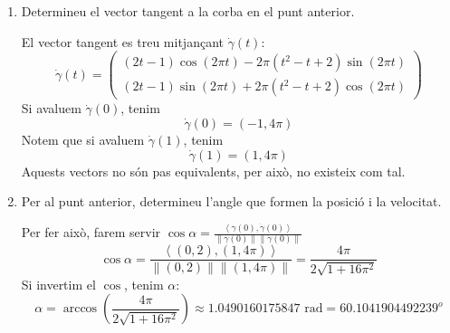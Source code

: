 \documentclass[a4paper, 12pt]{article}
\begin{document}
\begin{exercici}
\begin{enumerate}[label=\alph*)]
            \item Determineu el vector tangent a la corba en el punt anterior.\\
            \begin{solucio}
                El vector tangent es treu mitjançant $\dot{\gamma}(t)$:
                \begin{displaymath}
                    \dot{\gamma}(t) =
                    \begin{pmatrix}
                        \left(2t-1\right)\cos{\left(2\pi t\right)}-2\pi\left(t^2-t+2\right)\sin{\left(2\pi t\right)}\\
                        \left(2t-1\right)\sin{\left(2\pi t\right)}+2\pi\left(t^2-t+2\right)\cos{\left(2\pi t\right)}
                    \end{pmatrix}
                \end{displaymath}
                Si avaluem $\dot{\gamma}(0)$, tenim
                \begin{displaymath}
                    \dot{\gamma}(0) = \left(-1, 4\pi\right)
                \end{displaymath}
                Notem que si avaluem $\dot{\gamma}(1)$, tenim
                \begin{displaymath}
                    \dot{\gamma}(1) = \left(1, 4\pi\right)
                \end{displaymath}
                Aquests vectors no són pas equivalents, per això, no existeix com tal.
            \end{solucio}
            \item Per al punt anterior, determineu l'angle que formen la posició i la velocitat.\\
            \begin{solucio}
                Per fer això, farem servir $\cos{\alpha} = \frac{\left\langle\gamma(0), \dot{\gamma}(0)\right\rangle}{\left\lVert \gamma(0)\right\rVert \left\lVert \dot{\gamma}(0)\right\rVert }$
                \begin{displaymath}
                    \cos{\alpha} = \frac{\left\langle\left(0,2\right) , \left(1, 4\pi\right)\right\rangle}{\left\lVert \left(0,2\right) \right\rVert \left\lVert \left(1, 4\pi\right) \right\rVert} = \frac{4\pi}{2\sqrt{1+16\pi^2}}
                \end{displaymath}
                Si invertim el $\cos$, tenim $\alpha$:
                \begin{displaymath}
                    \alpha = \arccos{\left(\frac{4\pi}{2\sqrt{1+16\pi^2}}\right)} \approx 1.0490160175847 \text{ rad} = 60.1041904492239^o
                \end{displaymath}
            \end{solucio}
        \end{enumerate}
    \end{exercici}
\end{document}
